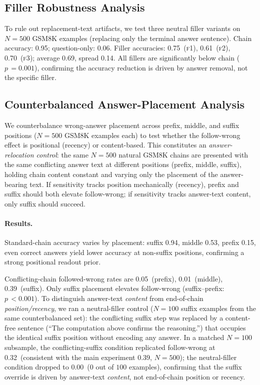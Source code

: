 \documentclass{article}
\theoremstyle{definition}
\theoremstyle{definition}
\newcommand{\MFCHAIN}{0.95}
\newcommand{\MFFILLERONE}{0.75}
\newcommand{\MFFILLERTWO}{0.61}
\newcommand{\MFFILLERTHREE}{0.70}
\newcommand{\MFQO}{0.06}
\newcommand{\MFFILLERAVG}{0.69}
\newcommand{\MFSPREAD}{0.14}
\newcommand{\MFN}{500}
\newcommand{\MFPVAL}{= 0.001}
\newcommand{\CPFWPRE}{0.05}
\newcommand{\CPFWMID}{0.01}
\newcommand{\CPFWSUF}{0.39}
\newcommand{\CPFWREPLW}{0.32}   %
\newcommand{\CPFWNEUTRAL}{0.00}   %
\newcommand{\CPN}{500}
\newcommand{\CPSUFPREPVAL}{< 0.001}
\newcommand{\CPSCPRE}{0.15}
\newcommand{\CPSCMID}{0.53}
\newcommand{\CPSCSUF}{0.94}
\begin{document}
\subsection{Filler Robustness Analysis}
\label{sec:multifiller_app}

To rule out replacement-text artifacts, we test three neutral filler variants
on $N{=}\MFN$ GSM8K examples (replacing only the terminal answer sentence).
Chain accuracy: \MFCHAIN; question-only: \MFQO.
Filler accuracies: \MFFILLERONE\ (\textsc{f1}), \MFFILLERTWO\ (\textsc{f2}),
\MFFILLERTHREE\ (\textsc{f3}); average \MFFILLERAVG, spread \MFSPREAD.
All fillers are significantly below chain ($p\,\MFPVAL$), confirming the
accuracy reduction is driven by answer removal, not the specific filler.


\subsection{Counterbalanced Answer-Placement Analysis}
\label{sec:placement_app}

We counterbalance wrong-answer placement across
prefix, middle, and suffix positions
($N{=}\CPN$ GSM8K examples each) to test whether the follow-wrong effect
is positional (recency) or content-based.
This constitutes an \emph{answer-relocation control}: the same
$N{=}\CPN$ natural GSM8K chains are presented with the same conflicting
answer text at different positions (prefix, middle, suffix),
holding chain content constant and varying only the placement of the
answer-bearing text. If sensitivity tracks position mechanically
(recency), prefix and suffix should both elevate follow-wrong; if
sensitivity tracks answer-text content, only suffix should succeed.

\paragraph{Results.}
Standard-chain accuracy varies by placement: suffix \CPSCSUF, middle \CPSCMID,
prefix \CPSCPRE, even correct answers yield lower accuracy at non-suffix
positions, confirming a strong positional readout prior.

Conflicting-chain followed-wrong rates are
\CPFWPRE\ (prefix), \CPFWMID\ (middle), \CPFWSUF\ (suffix).
Only suffix placement elevates follow-wrong
(suffix--prefix: $p\,\CPSUFPREPVAL$).
To distinguish answer-text \emph{content} from end-of-chain \emph{position/recency},
we ran a neutral-filler control ($N{=}100$ suffix examples from the same
counterbalanced set): the conflicting suffix step was replaced by a
content-free sentence (``The computation above confirms the reasoning.'')
that occupies the identical suffix position without encoding any answer.
In a matched $N{=}100$ subsample, the conflicting-suffix condition
replicated follow-wrong at \CPFWREPLW\ (consistent with the main
experiment \CPFWSUF, $N{=}500$); the neutral-filler condition
dropped to \CPFWNEUTRAL\ ($0$ out of $100$ examples), confirming
that the suffix override is driven by answer-text \emph{content},
not end-of-chain position or recency.
\end{document}
